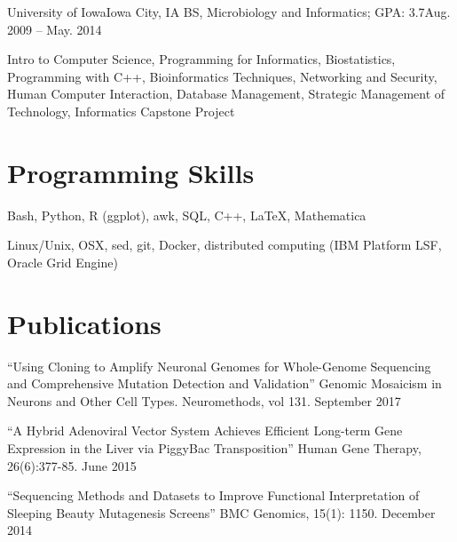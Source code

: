       \resumeSubheading
      {University of Iowa}{Iowa City, IA}
      {BS, Microbiology and Informatics;  GPA: 3.7}{Aug. 2009 -- May. 2014}
      
      \resumeItemListStart
      
         {Intro to Computer Science, Programming for Informatics, Biostatistics, Programming with C++, Bioinformatics Techniques, Networking and Security, Human Computer Interaction, Database Management, Strategic Management of Technology, Informatics Capstone Project}
      
      \resumeItemListEnd
   
   \resumeSubHeadingListEnd


\section{Programming Skills}
	\resumeSubHeadingListStart

		{Bash, Python, R (ggplot), awk, SQL, C++, \LaTeX, Mathematica}
		  
		{Linux/Unix, OSX, sed, git, Docker, distributed computing (IBM Platform LSF, Oracle Grid Engine)}
		  
	\resumeSubHeadingListEnd

\section{Publications}
	\resumeSubHeadingListStart

      { ``Using Cloning to Amplify Neuronal Genomes for Whole-Genome Sequencing and Comprehensive Mutation Detection and Validation'' Genomic Mosaicism in Neurons and Other Cell Types. Neuromethods, vol 131. September 2017}

		{ ``A Hybrid Adenoviral Vector System Achieves Efficient Long-term Gene Expression in the Liver via PiggyBac Transposition'' Human Gene Therapy, 26(6):377-85. June 2015}
      
      { ``Sequencing Methods and Datasets to Improve Functional Interpretation of Sleeping Beauty Mutagenesis Screens'' BMC Genomics, 15(1): 1150. December 2014}

	\resumeSubHeadingListEnd

